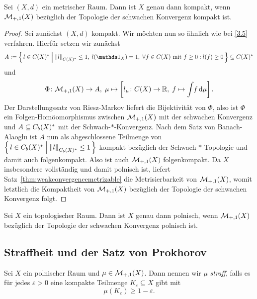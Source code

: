 \documentclass[../main/main.tex]{subfiles}
\begin{document}
	\begin{Satz}
		\label{thm:compactequivalence}
		Sei $(X, d)$ ein metrischer Raum. Dann ist $X$ genau dann kompakt, wenn $\mathcal{M}_{+,1}(X)$ bezüglich der Topologie der schwachen Konvergenz kompakt ist.
	\end{Satz}

	\begin{proof}
		Sei zunächst $(X, d)$ kompakt. Wir möchten nun so ähnlich wie bei \eqref{3.5} verfahren.
		Hierfür setzen wir zunächst
		\[ A \defby \setcomp{l \in C(X)^\ast}{\norm{l}_{C(X)^\ast} \leq 1, \; l(\indfct_{X}) = 1, \; \forall f \in C(X) \text{ mit } f \geq 0 : l(f) \geq 0} \subseteq C(X)^\ast \]
		und
		\[ \Phi \colon \mathcal{M}_{+,1}(X) \to A, \; \mu \mapsto \left[l_\mu \colon C(X) \to \mathbb{R}, \; f \mapsto \int_{} \, f \, \mathrm{d}\mu \right]  \text{.} \]
		Der Darstellungssatz von Riesz-Markov liefert die Bijektivität von $\Phi$, also ist $\Phi$ ein Folgen-Homöomorphismus zwischen 
		$\mathcal{M}_{+,1}(X)$ mit der schwachen Konvergenz und $A \subseteq C_b(X)^\ast$ mit der Schwach-$\ast$-Konvergenz. Nach dem Satz
		von Banach-Alaoglu ist $A$ nun als abgeschlossene Teilmenge von $\left\{\, l \in C_b(X)^\ast \; \middle| \; \left\lVert l\right\rVert_{C_b(X)^\ast} \leq 1 \,\right\}$ kompakt bezüglich der Schwach-$\ast$-Topologie und damit auch folgenkompakt.
		Also ist auch $\mathcal{M}_{+,1}(X)$ folgenkompakt. Da $X$ insbesondere vollständig und damit polnisch ist, liefert Satz~\ref{thm:weakconvergencemetrizable} die Metrisierbarkeit von $\mathcal{M}_{+,1}(X)$, womit
		letztlich die Kompaktheit von $\mathcal{M}_{+,1}(X)$ bezüglich der Topologie der schwachen Konvergenz folgt.
	\end{proof}


	\begin{Satz}
		Sei $X$ ein topologischer Raum. Dann ist $X$ genau dann polnisch, wenn $\mathcal{M}_{+,1}(X)$ bezüglich der Topologie der schwachen Konvergenz polnisch ist.
	\end{Satz}
	
	\subsection{Straffheit und der Satz von Prokhorov}
	
	\begin{Definition}
		Sei $X$ ein polnischer Raum und $\mu \in \mathcal{M}_{+,1}(X)$. Dann nennen wir 
		$\mu$ \emph{straff}, falls es für jedes $\varepsilon > 0$ eine kompakte Teilmenge
		$K_\varepsilon \subseteq X$ gibt mit 
		\[ \mu(K_\varepsilon) \geq 1  - \varepsilon \text{.} \]
	\end{Definition}
	
\end{document}
